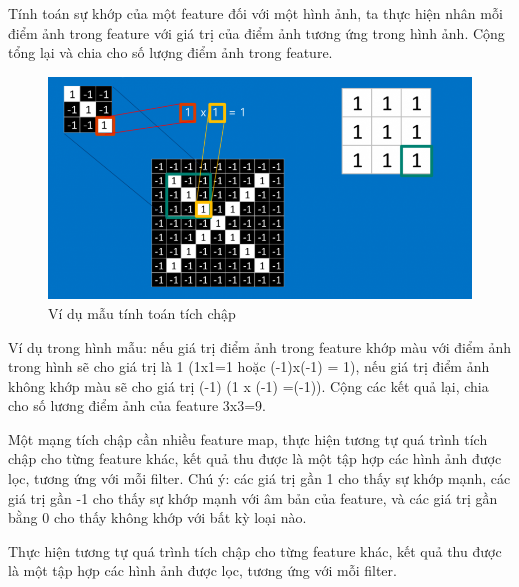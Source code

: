 Tính toán sự khớp của một feature đối với một hình ảnh, ta thực hiện nhân mỗi điểm ảnh trong feature với giá trị của điểm ảnh tương ứng trong hình ảnh. Cộng tổng lại và chia cho số lượng điểm ảnh trong feature.
\begin{center}
    \begin{figure}[h!]
    \begin{center}
     \includegraphics[scale=0.5]{img/convolution_2.png}
    \end{center}
    \caption{Ví dụ mẫu tính toán tích chập \cite{cnn}}
    \label{refhinh3}
    \end{figure}
\end{center}

Ví dụ trong hình mẫu: nếu giá trị điểm ảnh trong feature khớp màu với điểm ảnh trong hình sẽ cho giá trị là 1 (1x1=1 hoặc (-1)x(-1) = 1), nếu giá trị điểm ảnh không khớp màu sẽ cho giá trị (-1) (1 x (-1) =(-1)). Cộng các kết quả lại, chia cho số lương điểm ảnh của feature 3x3=9.

Một mạng tích chập cần nhiều feature map, thực hiện tương tự quá trình tích chập cho từng feature khác, kết quả thu được là một tập hợp các hình ảnh được lọc, tương ứng với mỗi filter.
Chú ý: các giá trị gần 1 cho thấy sự khớp mạnh, các giá trị gần -1 cho thấy sự khớp mạnh với âm bản của feature, và các giá trị gần bằng 0 cho thấy không khớp với bất kỳ loại nào.

Thực hiện tương tự quá trình tích chập cho từng feature khác, kết quả thu được là một tập hợp các hình ảnh được lọc, tương ứng với mỗi filter.

